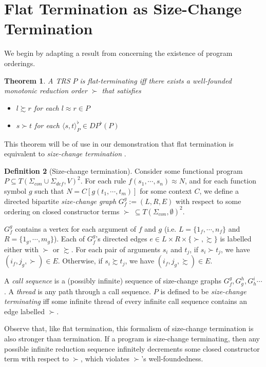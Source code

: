 \documentclass{article}
\newtheorem{theorem}{Theorem}%
\theoremstyle{definition}
\newtheorem{definition}[theorem]{Definition}
\begin{document}
\section{Flat Termination as Size-Change Termination}
We begin by adapting a result from \cite{arts2000dependency} concerning the existence of program orderings.
\begin{theorem}
    A TRS $P$ is flat-terminating iff there exists a well-founded monotonic reduction order $\succ$ that satisfies \begin{itemize}
        \item $l \succsim r$ for each $l \approx r \in P$
        \item $s \succ t$ for each $\langle s, t \rangle^\flat_P \in DP^\flat(P)$
    \end{itemize}
\end{theorem}
This theorem will be of use in our demonstration that flat termination is equivalent to \emph{size-change termination} \cite{lee2001sizechange,thiemann2005sizechange}.

\begin{definition}[Size-change termination]
    Consider some functional program $P \subseteq T(\Sigma_{con} \cup \Sigma_{def}, V)^2$. For each rule $f(s_1, \cdots, s_n) \approx N$, and for each function symbol $g$ such that $N = C[g(t_1, \cdots, t_m)]$ for some context $C$, we define a directed bipartite \emph{size-change graph} $G_f^g := (L, R, E)$ with respect to some ordering on closed constructor terms $\succ ~ \subseteq T(\Sigma_{con}, \emptyset)^2$. 

    $G_f^g$ contains a vertex for each argument of $f$ and $g$ (i.e. $L = \{1_f, \cdots, n_f\}$ and $R = \{1_g, \cdots, m_g\}$). Each of $G_f^g$'s directed edges $e \in L \times R \times \{\succ, \succsim\}$ is labelled either with $\succ$ or $\succsim$. For each pair of arguments $s_i$ and $t_j$, if $s_i \succ t_j$, we have $(i_f, j_g, \succ) \in E$. Otherwise, if $s_i \succsim t_j$, we have $(i_f, j_g, \succsim) \in E$.

    A \emph{call sequence} is a (possibly infinite) sequence of size-change graphs $G_f^g, G_g^h, G_h^i \cdots$. A \emph{thread} is any path through a call sequence. $P$ is defined to be \emph{size-change terminating} iff some infinite thread of every infinite call sequence contains an edge labelled $\succ$.
\end{definition}
Observe that, like flat termination, this formalism of size-change termination is also stronger than termination. If a program is size-change terminating, then any possible infinite reduction sequence infinitely decrements some closed constructor term with respect to $\succ$, which violates $\succ$'s well-foundedness.
\end{document}
